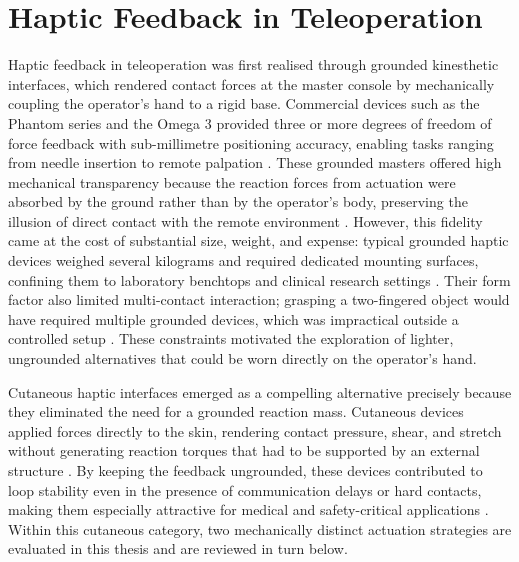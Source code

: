 \documentclass[12pt, a4paper]{report}
\begin{document}
\section{Haptic Feedback in Teleoperation}
Haptic feedback in teleoperation was first realised through grounded kinesthetic interfaces, which rendered contact forces at the master console by mechanically coupling the operator's hand to a rigid base. Commercial devices such as the Phantom series and the Omega 3 provided three or more degrees of freedom of force feedback with sub-millimetre positioning accuracy, enabling tasks ranging from needle insertion to remote palpation \cite{pacchierotti2017}. These grounded masters offered high mechanical transparency because the reaction forces from actuation were absorbed by the ground rather than by the operator's body, preserving the illusion of direct contact with the remote environment \cite{pacchierotti2017}. However, this fidelity came at the cost of substantial size, weight, and expense: typical grounded haptic devices weighed several kilograms and required dedicated mounting surfaces, confining them to laboratory benchtops and clinical research settings \cite{pacchierotti2017}. Their form factor also limited multi-contact interaction; grasping a two-fingered object would have required multiple grounded devices, which was impractical outside a controlled setup \cite{pacchierotti2017}. These constraints motivated the exploration of lighter, ungrounded alternatives that could be worn directly on the operator's hand.

Cutaneous haptic interfaces emerged as a compelling alternative precisely because they eliminated the need for a grounded reaction mass. Cutaneous devices applied forces directly to the skin, rendering contact pressure, shear, and stretch without generating reaction torques that had to be supported by an external structure \cite{pacchierotti2015}. By keeping the feedback ungrounded, these devices contributed to loop stability even in the presence of communication delays or hard contacts, making them especially attractive for medical and safety-critical applications \cite{pacchierotti2017}. Within this cutaneous category, two mechanically distinct actuation strategies are evaluated in this thesis and are reviewed in turn below.
\end{document}
